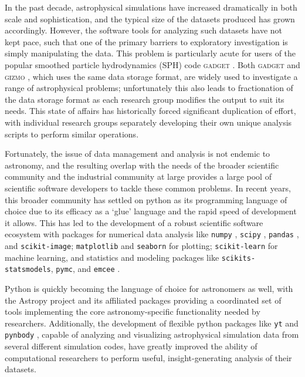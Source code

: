 \documentclass{thesis}
\newcommand{\code}[1]{\texttt{#1}}
\begin{document}
In the past decade, astrophysical simulations have increased dramatically in both scale and sophistication, and the typical size of the datasets produced has grown accordingly.  
However, the software tools for analyzing such datasets have not kept pace, such that one of the primary barriers to exploratory investigation is simply manipulating the data.  
This problem is particularly acute for users of the popular smoothed particle hydrodynamics (SPH) code \textsc{gadget} \citep{SpringelYoshidaWhite2001,Springel2005}.  
Both \textsc{gadget} and \textsc{gizmo} \citep{Hopkins2015}, which uses the same data storage format, are widely used to investigate a range of astrophysical problems; unfortunately this also leads to fractionation of the data storage format as each research group modifies the output to suit its needs.
This state of affairs has historically forced significant duplication of effort, with individual research groups separately developing their own unique analysis scripts to perform similar operations.

Fortunately, the issue of data management and analysis is not endemic to astronomy, and the resulting overlap with the needs of the broader scientific community and the industrial community at large provides a large pool of scientific software developers to tackle these common problems.
In recent years, this broader community has settled on python as its programming language of choice due to its efficacy as a `glue' language and the rapid speed of development it allows.  
This has led to the development of a robust scientific software ecosystem with packages for numerical data analysis like \code{numpy} \citep{VanderWaltColbertVaroquaux2011}, \code{scipy} \citep{JonesOliphantPeterson2001}, \code{pandas} \citep{McKinney2010}, and \code{scikit-image}; \code{matplotlib} \citep{Hunter2007} and \code{seaborn} for plotting; \code{scikit-learn} for machine learning, and statistics and modeling packages like \code{scikits-statsmodels}, \code{pymc}, and \code{emcee} \citep{Foreman-Mackeyetal2013}.

Python is quickly becoming the language of choice for astronomers as well, with the Astropy project \citep{Robitailleetal2013} and its affiliated packages providing a coordinated set of tools implementing the core astronomy-specific functionality needed by researchers. 
Additionally, the development of flexible python packages like \code{yt} \citep{Turketal2011} and \code{pynbody} \citep{Pontzenetal2013}, capable of analyzing and visualizing astrophysical simulation data from several different simulation codes, have greatly improved the ability of computational researchers to perform useful, insight-generating analysis of their datasets.
\end{document}
